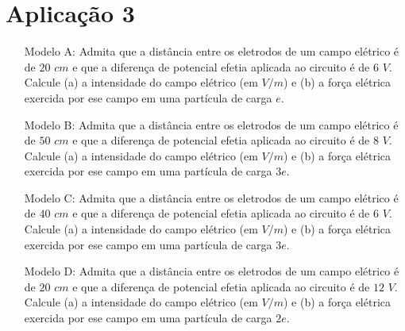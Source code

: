 \section{Aplicação 3} \label{ch:ASA3a3}
\begin{itemize}
    \item[Modelo A:] Admita que a distância entre os eletrodos de um campo elétrico é de $20$ $cm$ e que a diferença de potencial efetia aplicada ao circuito é de $6$ $V$. Calcule (a) a intensidade do campo elétrico (em $V/m$) e (b) a força elétrica exercida por ese campo em uma partícula de carga $e$.
    
    \item[Modelo B:] Admita que a distância entre os eletrodos de um campo elétrico é de $50$ $cm$ e que a diferença de potencial efetia aplicada ao circuito é de $8$ $V$. Calcule (a) a intensidade do campo elétrico (em $V/m$) e (b) a força elétrica exercida por ese campo em uma partícula de carga $3e$.
    
    \item[Modelo C:] Admita que a distância entre os eletrodos de um campo elétrico é de $40$ $cm$ e que a diferença de potencial efetia aplicada ao circuito é de $6$ $V$. Calcule (a) a intensidade do campo elétrico (em $V/m$) e (b) a força elétrica exercida por ese campo em uma partícula de carga $3e$.
    
    \item[Modelo D:] Admita que a distância entre os eletrodos de um campo elétrico é de $20$ $cm$ e que a diferença de potencial efetia aplicada ao circuito é de $12$ $V$. Calcule (a) a intensidade do campo elétrico (em $V/m$) e (b) a força elétrica exercida por ese campo em uma partícula de carga $2e$.
    
\end{itemize}